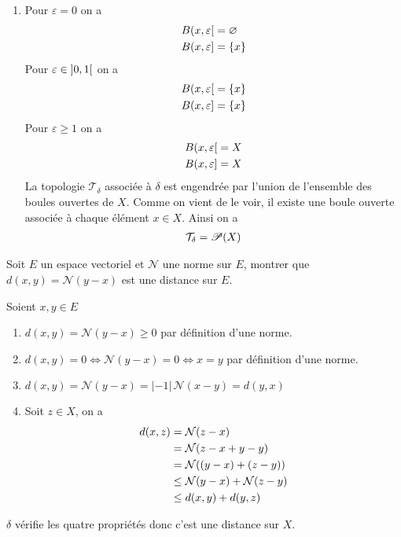 \documentclass[french,a4paper,10pt]{article}
\begin{document}
\begin{td-sol}
\begin{enumerate}
			\item Pour $\varepsilon=0$ on a
				\[\begin{aligned}
					B({x, \varepsilon}\mathopen{}[\mathclose{}&=\varnothing\\
					B({x, \varepsilon}\mathopen{}]\mathclose{}&=\{x\}
				\end{aligned}\]
				Pour $\varepsilon\in\mathopen{]}0, 1\mathclose{[}$ on a
				\[\begin{aligned}
					B({x, \varepsilon}\mathopen{}[\mathclose{}&=\{x\}\\
					B({x, \varepsilon}\mathopen{}]\mathclose{}&=\{x\}
				\end{aligned}\]
				Pour $\varepsilon\ge 1$ on a
				\[\begin{aligned}
					B({x, \varepsilon}\mathopen{}[\mathclose{}&=X\\
					B({x, \varepsilon}\mathopen{}]\mathclose{}&=X
				\end{aligned}\]
				La topologie $\mathcal{T}_\delta$ associée à $\delta$ est engendrée par l'union de l'ensemble des boules ouvertes de $X$. Comme on vient de le voir, il existe une boule ouverte associée à chaque élément $x\in X$. Ainsi on a
				\[\begin{aligned}
					\mathcal{T}_\delta = \mathscr{P}(X)
				\end{aligned}\]
		\end{enumerate}
	\end{td-sol}
	\medspace
	\begin{td-exo}
		Soit $E$ un espace vectoriel et $\mathcal{N}$ une norme sur $E$, montrer que $d(x,y)=\mathcal{N}(y-x)$ est une distance sur $E$.
	\end{td-exo}
	\begin{td-sol}
		Soient $x,y\in E$
		\begin{enumerate}[label=$(\roman*)$]
			\item $d(x, y) = \mathcal{N}(y-x)\ge 0$ par définition d'une norme.
			
			\item $d(x,y) = 0 \Longleftrightarrow \mathcal{N}(y-x) = 0 \Longleftrightarrow x=y$ par définition d'une norme.
			
			\item $d(x,y) =\mathcal{N}(y-x)=|-1|\, \mathcal{N}(x-y)= d(y,x)$
			
			\item Soit $z\in X$, on a
				\[\begin{aligned}
					d(x,z) &= \mathcal{N}(z-x)\\
					&=\mathcal{N}(z-x+y-y)\\
					&=\mathcal{N}((y-x)+(z-y))\\
					&\le \mathcal{N}(y-x)+\mathcal{N}(z-y)\\
					&\le d(x,y)+d(y,z)
				\end{aligned}\]
		\end{enumerate}
		$\delta$ vérifie les quatre propriétés donc c'est une distance sur $X$.
	\end{td-sol}
\end{document}
